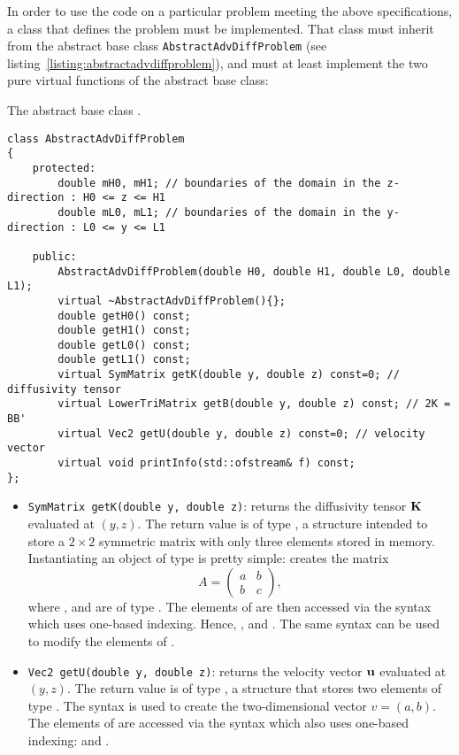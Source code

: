 In order to use the code on a particular problem meeting the above specifications, a class that defines the problem must be implemented. That class must inherit from the abstract base class \texttt{AbstractAdvDiffProblem} (see listing~\ref{listing:abstractadvdiffproblem}), and must at least implement the two pure virtual functions of the abstract base class:
\begin{listing}[ht!]
\caption{The abstract base class .}
\label{listing:abstractadvdiffproblem}
\begin{verbatim}
class AbstractAdvDiffProblem
{
	protected:
		double mH0, mH1; // boundaries of the domain in the z-direction : H0 <= z <= H1
		double mL0, mL1; // boundaries of the domain in the y-direction : L0 <= y <= L1

	public:
		AbstractAdvDiffProblem(double H0, double H1, double L0, double L1);
		virtual ~AbstractAdvDiffProblem(){};
		double getH0() const;
		double getH1() const; 
		double getL0() const;
		double getL1() const;
		virtual SymMatrix getK(double y, double z) const=0; // diffusivity tensor
		virtual LowerTriMatrix getB(double y, double z) const; // 2K = BB'
		virtual Vec2 getU(double y, double z) const=0; // velocity vector
		virtual void printInfo(std::ofstream& f) const;
};
\end{verbatim}
\end{listing}
\begin{itemize}[nosep]
	\item \texttt{SymMatrix getK(double y, double z)}: returns the diffusivity tensor $\mathbf K$ evaluated at $(y,z)$. The return value is of type , a structure intended to store a $2\times 2$ symmetric matrix with only three elements stored in memory. Instantiating an object  of type  is pretty simple:  creates the matrix
	\[
		A = \begin{pmatrix} a & b \\ b & c \end{pmatrix},
	\] 
	where ,  and  are of type . The elements of  are then accessed via the syntax  which uses one-based indexing. Hence, ,  and . The same syntax can be used to modify the elements of .
	\item \texttt{Vec2 getU(double y, double z)}: returns the velocity vector $\mathbf u$ evaluated at $(y,z)$. The return value is of type , a structure that stores two elements of type . The syntax  is used to create the two-dimensional vector $v = (a,b)$. The elements of  are accessed via the syntax  which also uses one-based indexing:  and .
\end{itemize}
